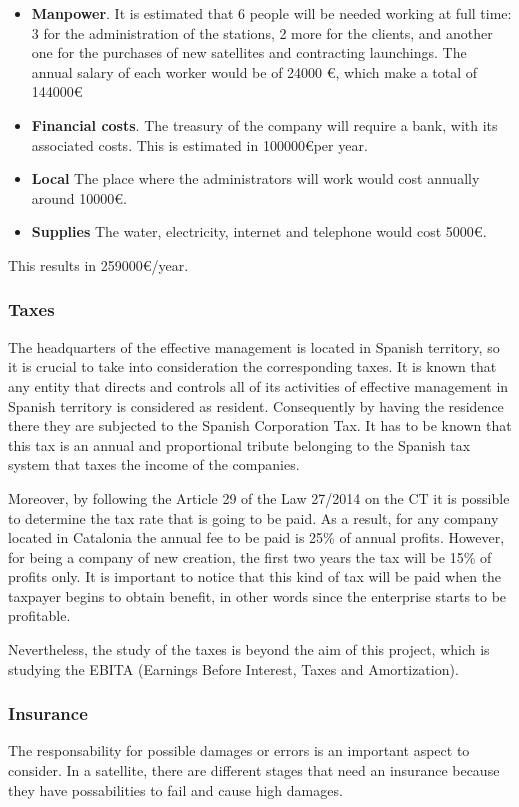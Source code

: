 \begin{itemize}
\item \textbf{Manpower}. It is estimated that 6 people will be needed working at full time: 3 for the administration of the stations, 2 more for the clients, and another one for the purchases of new satellites and contracting launchings. The annual salary of each worker would be of 24000 \euro, which make a total of 144000\euro
\item \textbf{Financial costs}. The treasury of the company will require a  bank, with its associated costs. This is estimated in 100000\euro  per year.
\item \textbf{Local} The place where the administrators will work would cost annually around 10000\euro .
\item \textbf{Supplies} The water, electricity, internet and telephone would cost 5000\euro .
\end{itemize}

This results in 259000\euro/year.

\subsubsection{Taxes}
The headquarters of the effective management is located in Spanish territory, so it is crucial to take into consideration the corresponding taxes. It is known that any entity that directs and controls all of its activities of effective management in Spanish territory is considered as resident. Consequently by having the residence there they are subjected to the Spanish Corporation Tax. It has to be known that this tax is an annual and proportional tribute belonging to the Spanish tax system that taxes the income of the companies.

Moreover, by following the Article 29 of the Law 27/2014 on the CT it is possible to determine the tax rate that is going to be paid. As a result, for any company located in Catalonia the annual fee to be paid is 25\% of annual profits. However, for being a company of new creation, the first two years the tax will be 15\% of profits only. It is important to notice that this kind of tax will be paid when the taxpayer begins to obtain benefit, in other words since the enterprise starts to be profitable. 

Nevertheless, the study of the taxes is beyond the aim of this project, which is studying the EBITA (Earnings Before Interest, Taxes and Amortization).
  
\subsubsection{Insurance}
The responsability for possible damages or errors is an important aspect to consider. In a satellite, there are different stages that need an insurance because they have possabilities to fail and cause high damages.

